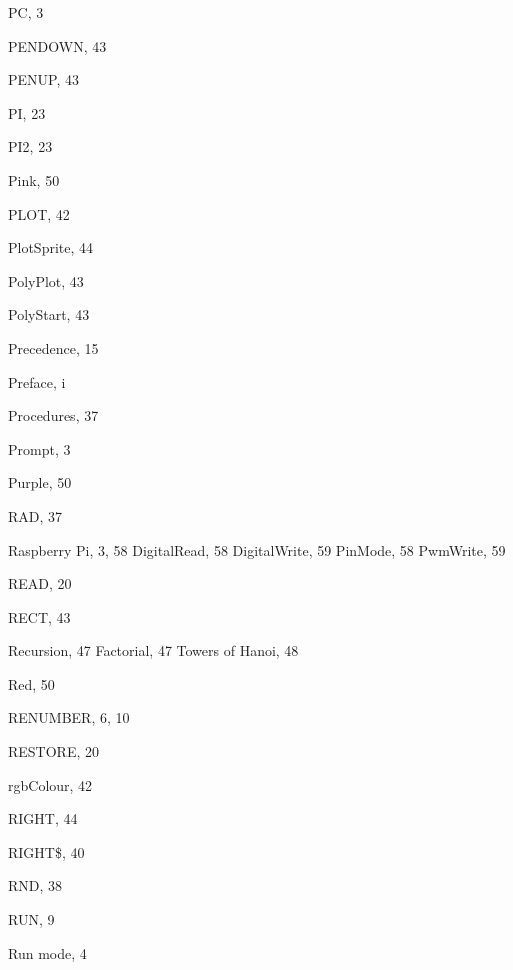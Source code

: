 \begin{theindex}
  \item PC, 3
  \item PENDOWN, 43
  \item PENUP, 43
  \item PI, 23
  \item PI2, 23
  \item Pink, 50
  \item PLOT, 42
  \item PlotSprite, 44
  \item PolyPlot, 43
  \item PolyStart, 43
  \item Precedence, 15
  \item Preface, i
  \item Procedures, 37
  \item Prompt, 3
  \item Purple, 50

  \indexspace

  \item RAD, 37
  \item Raspberry Pi, 3, 58
    \subitem DigitalRead, 58
    \subitem DigitalWrite, 59
    \subitem PinMode, 58
    \subitem PwmWrite, 59
  \item READ, 20
  \item RECT, 43
  \item Recursion, 47
    \subitem Factorial, 47
    \subitem Towers of Hanoi, 48
  \item Red, 50
  \item RENUMBER, 6, 10
  \item RESTORE, 20
  \item rgbColour, 42
  \item RIGHT, 44
  \item RIGHT\$, 40
  \item RND, 38
  \item RUN, 9
  \item Run mode, 4

  \indexspace


\end{theindex}
